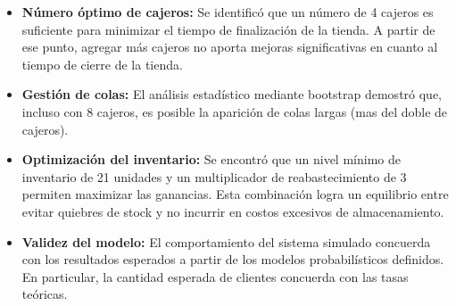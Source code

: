 \documentclass[12pt, a4paper]{article}
\begin{document}
\begin{itemize}
\item \textbf{Número óptimo de cajeros:} Se identificó que un número de 4 cajeros es suficiente para minimizar el tiempo de finalización de la tienda. A partir de ese punto, agregar más cajeros no aporta mejoras significativas en cuanto al tiempo de cierre de la tienda.

\item \textbf{Gestión de colas:} El análisis estadístico mediante bootstrap demostró que, incluso con 8 cajeros, es posible la aparición de colas largas (mas del doble de cajeros).

\item \textbf{Optimización del inventario:} Se encontró que un nivel mínimo de inventario de 21 unidades y un multiplicador de reabastecimiento de 3 permiten maximizar las ganancias. Esta combinación logra un equilibrio entre evitar quiebres de stock y no incurrir en costos excesivos de almacenamiento.

\item \textbf{Validez del modelo:} El comportamiento del sistema simulado concuerda con los resultados esperados a partir de los modelos probabilísticos definidos. En particular, la cantidad esperada de clientes concuerda con las tasas teóricas.
\end{itemize}
\end{document}
